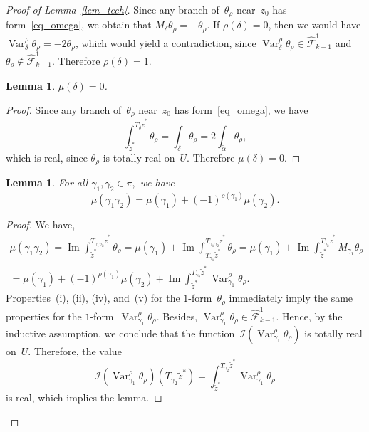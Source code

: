 \documentclass[reqno,tbtags,12pt]{amsart}
\numberwithin{equation}{section}
\newcommand{\hCF}{\widehat{\mathcal{F}}}
\newcommand{\I}{\mathcal{I}}
\newcommand{\tz}{\tilde{z}}
\renewcommand{\Im}{\mathop{\mathrm{Im}}\nolimits}
\newcommand{\Var}{\mathop{\mathrm{Var}}\nolimits}
\newtheorem{lem}[theorem]{Lemma}
\theoremstyle{definition}
\begin{document}
\begin{proof}[Proof of Lemma~\ref{lem_tech}]
Since any branch of~$\theta_{\rho}$  near~$z_0$ has  form~\eqref{eq_omega}, we obtain that  $M_{\delta}\theta_{\rho}=-\theta_{\rho}$. If $\rho(\delta)=0$, then  we would have $\Var_{\delta}^{\rho}\theta_{\rho}=-2\theta_{\rho}$, which would yield a contradiction, since $\Var_{\delta}^{\rho}\theta_{\rho}\in\hCF^1_{k-1}$ and $\theta_{\rho}\notin\hCF_{k-1}^1$. Therefore $\rho(\delta)=1$.



 \begin{lem}\label{slem_mu_delta}
 $\mu(\delta)=0$. 
 \end{lem}

\begin{proof}
Since any branch of~$\theta_{\rho}$  near~$z_0$ has  form~\eqref{eq_omega}, we have
$$
\int_{\tz^*}^{T_{\delta}\tz^*}\theta_{\rho}=\int_{\tilde\delta}\theta_{\rho}=2\int_{\tilde\alpha}\theta_{\rho},
$$
which is real, since $\theta_{\rho}$ is totally real on~$U$. Therefore $\mu(\delta)=0$.
\end{proof}


\begin{lem}\label{slem_mu_ah}
For all\/ $\gamma_1,\gamma_2\in\pi,$ we have
\begin{equation*}
\mu(\gamma_1\gamma_2)=\mu(\gamma_1)+(-1)^{\rho(\gamma_1)}\mu(\gamma_2).
\end{equation*}
\end{lem}

\begin{proof}
We have,
\begin{multline*}
\mu(\gamma_1\gamma_2)=\Im\int_{\tz^*}^{T_{\gamma_1\gamma_2}\tz^*}\theta_{\rho}=\mu(\gamma_1)+\Im\int_{T_{\gamma_1}\tz^*}^{T_{\gamma_1\gamma_2}\tz^*}\theta_{\rho}=\mu(\gamma_1)+\Im\int_{\tz^*}^{T_{\gamma_2}\tz^*}M_{\gamma_1}\theta_{\rho}\\
{}=\mu(\gamma_1)+(-1)^{\rho(\gamma_1)}\mu(\gamma_2)+\Im\int_{\tz^*}^{T_{\gamma_2}\tz^*}\Var_{\gamma_1}^{\rho}\theta_{\rho}.
\end{multline*}
Properties~(i), (ii), (iv), and~(v) for the $1$-form~$\theta_{\rho}$ immediately imply the same properties for
the $1$-form~$\Var_{\gamma_1}^{\rho}\theta_{\rho}$. Besides, $\Var_{\gamma_1}^{\rho}\theta_{\rho}\in\hCF_{k-1}^1$. Hence, by the inductive assumption, we conclude that the function~$\I(\Var_{\gamma_1}^{\rho}\theta_{\rho})$ is totally real on~$U$. Therefore, the value 
$$\I(\Var_{\gamma_1}^{\rho}\theta_{\rho})(T_{\gamma_2}\tz^*)=\int_{\tz^*}^{T_{\gamma_2}\tz^*}\Var_{\gamma_1}^{\rho}\theta_{\rho}$$ is real, which implies the lemma.
\end{proof}


\end{proof}
\end{document}
